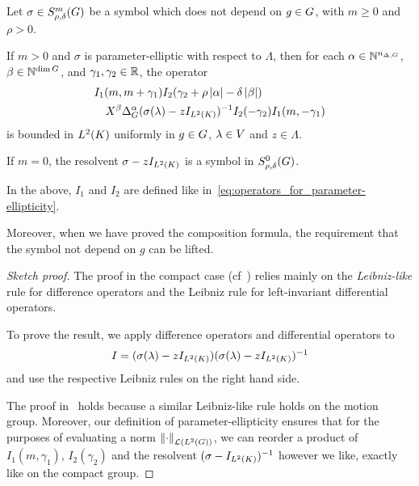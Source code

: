 \begin{lemma}
\label{lemma:fall_in_order_for_parameter-elliptic_symbols}
    Let $\sigma \in \SymbolClass m {\rho, \delta}$ be a symbol which does not depend on $g \in \Group$,
    with $m \geq 0$ and $\rho > 0$.

    If $m > 0$ and $\sigma$ is parameter-elliptic with respect to $\Lambda$, then
    for each $\alpha \in \N^{\dimDifferenceOperators}$, $\beta \in \N^{\dim \Group}$, and $\gamma_1, \gamma_2 \in \R$,
    the operator
    \begin{align*}
        &I_1(m, m + \gamma_1)
        I_2(\gamma_2 + \rho \abs \alpha - \delta \abs \beta)\\
        &\quad
        \LeftDifferentialOperator \beta
        \DifferenceOperatorOrder \alpha (\sigma(\lambda) - z \Id {\Lebesgue 2 \CompactGroup})^{-1}
        I_2(-\gamma_2)
        I_1(m, -\gamma_1)
    \end{align*}
    is bounded in $\Lebesgue 2 \CompactGroup$ uniformly in $g \in \Group$, $\lambda \in \VectorSpace$ and $z \in \Lambda$.

    If $m = 0$,
    the resolvent $\sigma - z \Id {\Lebesgue 2 \CompactGroup}$ is a symbol in $\SymbolClass 0 {\rho, \delta}$.

    In the above, $I_1$ and $I_2$ are defined like in~\eqref{eq:operators_for_parameter-ellipticity}.

    Moreover, when we have proved the composition formula,
    the requirement that the symbol not depend on $g$ can be lifted.
\end{lemma}
\begin{proof}[Sketch proof]
    The proof in the compact case (cf~\cite[Theorem 3.1. (1)]{RuzhanskyWirth14}) relies mainly on the \emph{Leibniz-like} rule for difference operators
    and the Leibniz rule for left-invariant differential operators.

    To prove the result, we apply difference operators and differential operators to
    \begin{align*}
        I = (\sigma(\lambda) - z \Id {\Lebesgue 2 \CompactGroup}) (\sigma(\lambda) - z \Id {\Lebesgue 2 \CompactGroup})^{-1}
    \end{align*}
    and use the respective Leibniz rules on the right hand side.

    The proof in~\cite{RuzhanskyWirth14} holds because a similar Leibniz-like rule holds on the motion group.
    Moreover, our definition of parameter-ellipticity ensures that for the purposes of evaluating a norm $\norm [\Lin {\Lebesgue 2 \Group}] \dummy$,
    we can reorder a product of $I_1(m, \gamma_1)$, $I_2(\gamma_2)$ and the resolvent $(\sigma - \Id {\Lebesgue 2 \CompactGroup})^{-1}$ however we like,
    exactly like on the compact group.
\end{proof}


